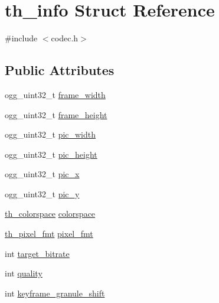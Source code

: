 \hypertarget{structth__info}{\section{th\+\_\+info Struct Reference}
\label{structth__info}
}


{\ttfamily \#include $<$codec.\+h$>$}

\subsection*{Public Attributes}
\begin{DoxyCompactItemize}
\item 
ogg\+\_\+uint32\+\_\+t \hyperlink{structth__info_a6b8087a4d831da53011a43b8d74087a0}{frame\+\_\+width}
\item 
ogg\+\_\+uint32\+\_\+t \hyperlink{structth__info_a6b1adc3a16a8336a72692b0a5937214c}{frame\+\_\+height}
\item 
ogg\+\_\+uint32\+\_\+t \hyperlink{structth__info_a5048edf77b141dd3e9a92ca85e317345}{pic\+\_\+width}
\item 
ogg\+\_\+uint32\+\_\+t \hyperlink{structth__info_a775178474283c5990ba73f9ba7f6b88b}{pic\+\_\+height}
\item 
ogg\+\_\+uint32\+\_\+t \hyperlink{structth__info_a5b3f834bcf141564e7bb14f49101870f}{pic\+\_\+x}
\item 
ogg\+\_\+uint32\+\_\+t \hyperlink{structth__info_a8aacc575cab2dfe3735001c2ad32aa14}{pic\+\_\+y}
\item 
\hyperlink{theora_2libtheora-1_81_81_2include_2theora_2codec_8h_a4ce7a695ce353b1582d29b6c1ddf31a0}{th\+\_\+colorspace} \hyperlink{structth__info_a8c7828cd0e023e9d21108160d53659a6}{colorspace}
\item 
\hyperlink{theora_2libtheora-1_81_81_2include_2theora_2codec_8h_a5c9e7f2f0c7ed209c9ca3ed0abd328bc}{th\+\_\+pixel\+\_\+fmt} \hyperlink{structth__info_a2301388ef3755c41ab12fd144c1fc54e}{pixel\+\_\+fmt}
\item 
int \hyperlink{structth__info_a1d9c8d768a4ae623269f5bd8f6f7a015}{target\+\_\+bitrate}
\item 
int \hyperlink{structth__info_aa4cdcf96cb46b256821993e9a830ee02}{quality}
\item 
int \hyperlink{structth__info_a693ca4ab11fbc0c3f32594b4bb8766ed}{keyframe\+\_\+granule\+\_\+shift}
\end{DoxyCompactItemize}
